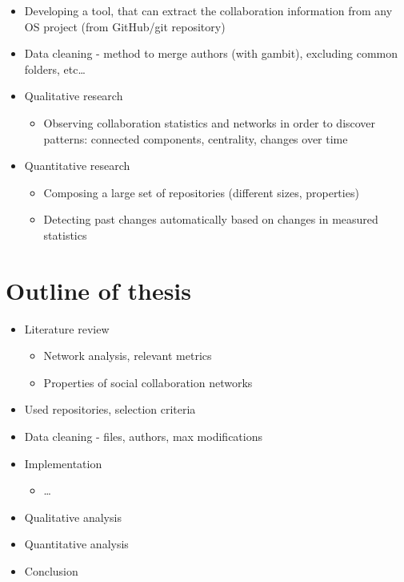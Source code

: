 \begin{itemize}
    \item Developing a tool, that can extract the collaboration information from any OS project (from GitHub/git repository)
    \item Data cleaning - method to merge authors (with gambit), excluding common folders, etc\dots
    \item Qualitative research
    \begin{itemize}
        \item Observing collaboration statistics and networks in order to discover patterns: connected components, centrality, changes over time
    \end{itemize}
    \item Quantitative research
    \begin{itemize}
        \item Composing a large set of repositories (different sizes, properties)
        \item Detecting past changes automatically based on changes in measured statistics
    \end{itemize}
\end{itemize}

\section{Outline of thesis}
\begin{itemize}
    \item Literature review
    \begin{itemize}
        \item Network analysis, relevant metrics
        \item Properties of social collaboration networks
    \end{itemize}
    \item Used repositories, selection criteria
    \item Data cleaning - files, authors, max modifications
    \item Implementation
    \begin{itemize}
        \item \dots
    \end{itemize}
    \item Qualitative analysis
    \item Quantitative analysis
    \item Conclusion
\end{itemize}

